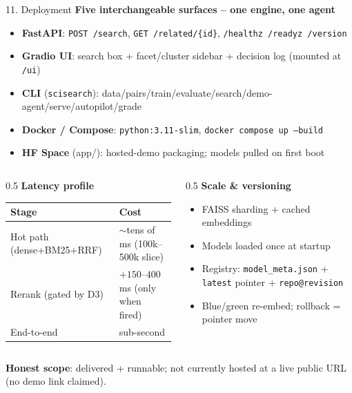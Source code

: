 \documentclass[10pt,aspectratio=169]{beamer}
\begin{document}
\begin{frame}{11. Deployment}
\textbf{Five interchangeable surfaces -- one engine, one agent}
\begin{itemize}\small
  \item \textbf{FastAPI}: \texttt{POST /search}, \texttt{GET /related/\{id\}}, \texttt{/healthz /readyz /version}
  \item \textbf{Gradio UI}: search box + facet/cluster sidebar + decision log (mounted at \texttt{/ui})
  \item \textbf{CLI} (\texttt{scisearch}): data/pairs/train/evaluate/search/demo-agent/serve/autopilot/grade
  \item \textbf{Docker / Compose}: \texttt{python:3.11-slim}, \texttt{docker compose up --build}
  \item \textbf{HF Space} (app/): hosted-demo packaging; models pulled on first boot
\end{itemize}

\begin{columns}[T]
\begin{column}{0.5\textwidth}
\textbf{Latency profile}
\begin{table}[h]\centering\scriptsize
\begin{tabular}{ll}
\toprule
\textbf{Stage} & \textbf{Cost} \\
\midrule
Hot path (dense+BM25+RRF) & $\sim$tens of ms (100k--500k slice) \\
Rerank (gated by D3) & $+150$--$400$\,ms (only when fired) \\
End-to-end & sub-second \\
\bottomrule
\end{tabular}
\end{table}
\end{column}
\begin{column}{0.5\textwidth}
\textbf{Scale \& versioning}
\begin{itemize}\scriptsize
  \item FAISS sharding + cached embeddings
  \item Models loaded once at startup
  \item Registry: \texttt{model\_meta.json} + \texttt{latest} pointer + \texttt{repo@revision}
  \item Blue/green re-embed; rollback = pointer move
\end{itemize}
\end{column}
\end{columns}

\scriptsize \textbf{Honest scope}: delivered + runnable; not currently hosted at a live public URL (no demo link claimed).
\end{frame}
\end{document}
